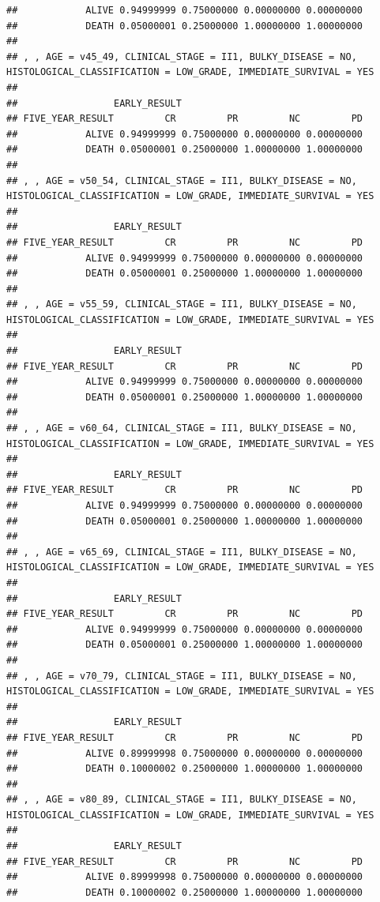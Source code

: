 \documentclass[]{article}
\begin{document}
\begin{verbatim}
##            ALIVE 0.94999999 0.75000000 0.00000000 0.00000000
##            DEATH 0.05000001 0.25000000 1.00000000 1.00000000
## 
## , , AGE = v45_49, CLINICAL_STAGE = II1, BULKY_DISEASE = NO, HISTOLOGICAL_CLASSIFICATION = LOW_GRADE, IMMEDIATE_SURVIVAL = YES
## 
##                 EARLY_RESULT
## FIVE_YEAR_RESULT         CR         PR         NC         PD
##            ALIVE 0.94999999 0.75000000 0.00000000 0.00000000
##            DEATH 0.05000001 0.25000000 1.00000000 1.00000000
## 
## , , AGE = v50_54, CLINICAL_STAGE = II1, BULKY_DISEASE = NO, HISTOLOGICAL_CLASSIFICATION = LOW_GRADE, IMMEDIATE_SURVIVAL = YES
## 
##                 EARLY_RESULT
## FIVE_YEAR_RESULT         CR         PR         NC         PD
##            ALIVE 0.94999999 0.75000000 0.00000000 0.00000000
##            DEATH 0.05000001 0.25000000 1.00000000 1.00000000
## 
## , , AGE = v55_59, CLINICAL_STAGE = II1, BULKY_DISEASE = NO, HISTOLOGICAL_CLASSIFICATION = LOW_GRADE, IMMEDIATE_SURVIVAL = YES
## 
##                 EARLY_RESULT
## FIVE_YEAR_RESULT         CR         PR         NC         PD
##            ALIVE 0.94999999 0.75000000 0.00000000 0.00000000
##            DEATH 0.05000001 0.25000000 1.00000000 1.00000000
## 
## , , AGE = v60_64, CLINICAL_STAGE = II1, BULKY_DISEASE = NO, HISTOLOGICAL_CLASSIFICATION = LOW_GRADE, IMMEDIATE_SURVIVAL = YES
## 
##                 EARLY_RESULT
## FIVE_YEAR_RESULT         CR         PR         NC         PD
##            ALIVE 0.94999999 0.75000000 0.00000000 0.00000000
##            DEATH 0.05000001 0.25000000 1.00000000 1.00000000
## 
## , , AGE = v65_69, CLINICAL_STAGE = II1, BULKY_DISEASE = NO, HISTOLOGICAL_CLASSIFICATION = LOW_GRADE, IMMEDIATE_SURVIVAL = YES
## 
##                 EARLY_RESULT
## FIVE_YEAR_RESULT         CR         PR         NC         PD
##            ALIVE 0.94999999 0.75000000 0.00000000 0.00000000
##            DEATH 0.05000001 0.25000000 1.00000000 1.00000000
## 
## , , AGE = v70_79, CLINICAL_STAGE = II1, BULKY_DISEASE = NO, HISTOLOGICAL_CLASSIFICATION = LOW_GRADE, IMMEDIATE_SURVIVAL = YES
## 
##                 EARLY_RESULT
## FIVE_YEAR_RESULT         CR         PR         NC         PD
##            ALIVE 0.89999998 0.75000000 0.00000000 0.00000000
##            DEATH 0.10000002 0.25000000 1.00000000 1.00000000
## 
## , , AGE = v80_89, CLINICAL_STAGE = II1, BULKY_DISEASE = NO, HISTOLOGICAL_CLASSIFICATION = LOW_GRADE, IMMEDIATE_SURVIVAL = YES
## 
##                 EARLY_RESULT
## FIVE_YEAR_RESULT         CR         PR         NC         PD
##            ALIVE 0.89999998 0.75000000 0.00000000 0.00000000
##            DEATH 0.10000002 0.25000000 1.00000000 1.00000000

\end{verbatim}
\end{document}
